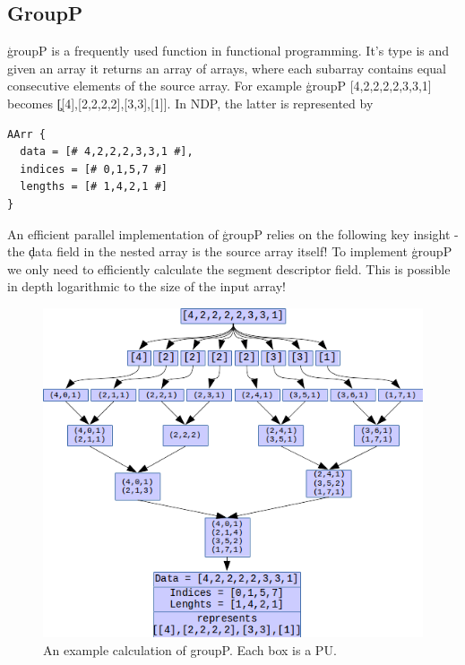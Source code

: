   \subsection{GroupP}
    \c{groupP} is a frequently used function in functional programming.
    It's type is \type{[:a:] -> [:[:a:]:]} and given an array it returns an array of arrays,
    where each subarray contains equal consecutive
    elements of the source array. For example
    \c{groupP [4,2,2,2,2,3,3,1]} becomes \c{[[4],[2,2,2,2],[3,3],[1]]}.
    In NDP, the latter is represented by
    \begin{lstlisting}
AArr {
  data = [# 4,2,2,2,3,3,1 #],
  indices = [# 0,1,5,7 #]
  lengths = [# 1,4,2,1 #]
}
    \end{lstlisting}
    An efficient parallel implementation of \c{groupP}
    relies on the following key insight - the \c{data} field in the nested array
    is the source array itself! To implement \c{groupP} we only
    need to efficiently calculate the segment descriptor field. This is
    possible in depth logarithmic to the size of the input array!
    
    \begin{figure}[h!]
        \begin{center}
        \includegraphics[width=\linewidth]{groupP.png}
        \caption{An example calculation of groupP. Each box is a PU.}
        \label{figure:groupP}
        \end{center}
    \end{figure}
    
